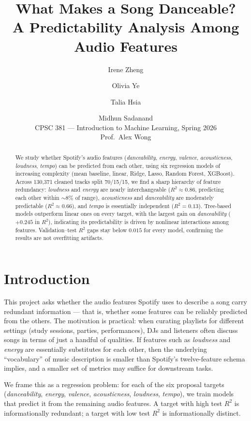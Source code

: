 \documentclass[11pt]{article}
\title{What Makes a Song Danceable?\\
\large A Predictability Analysis Among Audio Features}
\author{Irene Zheng \and Olivia Ye \and Talia Hsia \and Midhun Sadanand\\
CPSC 381 --- Introduction to Machine Learning, Spring 2026\\
Prof.\ Alex Wong}
\date{}
\begin{document}
\maketitle

\begin{abstract}
We study whether Spotify's audio features (\emph{danceability}, \emph{energy}, \emph{valence}, \emph{acousticness}, \emph{loudness}, \emph{tempo}) can be predicted from each other, using six regression models of increasing complexity (mean baseline, linear, Ridge, Lasso, Random Forest, XGBoost). Across 130{,}371 cleaned tracks split 70/15/15, we find a sharp hierarchy of feature redundancy: \emph{loudness} and \emph{energy} are nearly interchangeable ($R^2 \approx 0.86$, predicting each other within $\sim 8\%$ of range), \emph{acousticness} and \emph{danceability} are moderately predictable ($R^2 \approx 0.66$), and \emph{tempo} is essentially independent ($R^2 = 0.13$). Tree-based models outperform linear ones on every target, with the largest gain on \emph{danceability} ($+0.245$ in $R^2$), indicating its predictability is driven by nonlinear interactions among features. Validation--test $R^2$ gaps stay below $0.015$ for every model, confirming the results are not overfitting artifacts.
\end{abstract}

\section{Introduction}

This project asks whether the audio features Spotify uses to describe a song carry redundant information --- that is, whether some features can be reliably predicted from the others. The motivation is practical: when curating playlists for different settings (study sessions, parties, performances), DJs and listeners often discuss songs in terms of just a handful of qualities. If features such as \emph{loudness} and \emph{energy} are essentially substitutes for each other, then the underlying ``vocabulary'' of music description is smaller than Spotify's twelve-feature schema implies, and a smaller set of metrics may suffice for downstream tasks.

We frame this as a regression problem: for each of the six proposal targets (\emph{danceability}, \emph{energy}, \emph{valence}, \emph{acousticness}, \emph{loudness}, \emph{tempo}), we train models that predict it from the remaining audio features. A target with high test $R^2$ is informationally redundant; a target with low test $R^2$ is informationally distinct.
\end{document}
